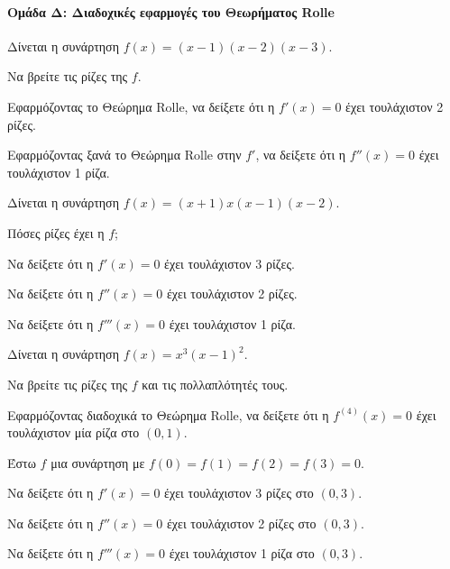 \documentclass[11pt,a4paper,modern]{FFExercises}
\begin{document}

\paragraph{Ομάδα Δ: Διαδοχικές εφαρμογές του Θεωρήματος Rolle}

\askhsh
Δίνεται η συνάρτηση $f(x) = (x-1)(x-2)(x-3)$.
\begin{alist}
  \item Να βρείτε τις ρίζες της $f$.
  \item Εφαρμόζοντας το Θεώρημα Rolle, να δείξετε ότι η $f'(x) = 0$ έχει τουλάχιστον 2 ρίζες.
  \item Εφαρμόζοντας ξανά το Θεώρημα Rolle στην $f'$, να δείξετε ότι η $f''(x) = 0$ έχει τουλάχιστον 1 ρίζα.
\end{alist}

\askhsh
Δίνεται η συνάρτηση $f(x) = (x+1)x(x-1)(x-2)$.
\begin{alist}
  \item Πόσες ρίζες έχει η $f$;
  \item Να δείξετε ότι η $f'(x) = 0$ έχει τουλάχιστον 3 ρίζες.
  \item Να δείξετε ότι η $f''(x) = 0$ έχει τουλάχιστον 2 ρίζες.
  \item Να δείξετε ότι η $f'''(x) = 0$ έχει τουλάχιστον 1 ρίζα.
\end{alist}

\askhsh
Δίνεται η συνάρτηση $f(x) = x^3(x-1)^2$.
\begin{alist}
  \item Να βρείτε τις ρίζες της $f$ και τις πολλαπλότητές τους.
  \item Εφαρμόζοντας διαδοχικά το Θεώρημα Rolle, να δείξετε ότι η $f^{(4)}(x) = 0$ έχει τουλάχιστον μία ρίζα στο $(0, 1)$.
\end{alist}

\askhsh
Έστω $f$ μια συνάρτηση με $f(0) = f(1) = f(2) = f(3) = 0$.
\begin{alist}
  \item Να δείξετε ότι η $f'(x) = 0$ έχει τουλάχιστον 3 ρίζες στο $(0, 3)$.
  \item Να δείξετε ότι η $f''(x) = 0$ έχει τουλάχιστον 2 ρίζες στο $(0, 3)$.
  \item Να δείξετε ότι η $f'''(x) = 0$ έχει τουλάχιστον 1 ρίζα στο $(0, 3)$.
\end{alist}
\end{document}
